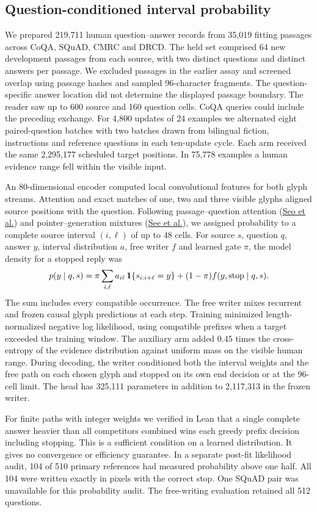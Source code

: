 \subsection*{Question-conditioned interval probability}
We prepared 219,711 human question--answer records from 35,019 fitting passages across CoQA, SQuAD, CMRC and DRCD. The held set comprised 64 new development passages from each source, with two distinct questions and distinct answers per passage. We excluded passages in the earlier assay and screened overlap using passage hashes and sampled 96-character fragments. The question-specific answer location did not determine the displayed passage boundary. The reader saw up to 600 source and 160 question cells. CoQA queries could include the preceding exchange. For 4,800 updates of 24 examples we alternated eight paired-question batches with two batches drawn from bilingual fiction, instructions and reference questions in each ten-update cycle. Each arm received the same 2,295,177 scheduled target positions. In 75,778 examples a human evidence range fell within the visible input.

An 80-dimensional encoder computed local convolutional features for both glyph streams. Attention and exact matches of one, two and three visible glyphs aligned source positions with the question. Following passage--question attention (\href{https://arxiv.org/abs/1611.01603}{Seo et al.}) and pointer--generation mixtures (\href{https://aclanthology.org/P17-1099/}{See et al.}), we assigned probability to a complete source interval $(i,\ell)$ of up to 48 cells. For source $s$, question $q$, answer $y$, interval distribution $a$, free writer $f$ and learned gate $\pi$, the model density for a stopped reply was
\[
 p(y\mid q,s)=\pi\sum_{i,\ell}a_{i\ell}\,
 {\bf1}\{s_{i:i+\ell}=y\}+(1-\pi)f(y,\mathrm{stop}\mid q,s).
\]
The sum includes every compatible occurrence. The free writer mixes recurrent and frozen causal glyph predictions at each step. Training minimized length-normalized negative log likelihood, using compatible prefixes when a target exceeded the training window. The auxiliary arm added $0.45$ times the cross-entropy of the evidence distribution against uniform mass on the visible human range. During decoding, the writer conditioned both the interval weights and the free path on each chosen glyph and stopped on its own end decision or at the 96-cell limit. The head has 325,111 parameters in addition to 2,117,313 in the frozen writer.

For finite paths with integer weights we verified in Lean that a single complete answer heavier than all competitors combined wins each greedy prefix decision including stopping. This is a sufficient condition on a learned distribution. It gives no convergence or efficiency guarantee. In a separate post-fit likelihood audit, 104 of 510 primary references had measured probability above one half. All 104 were written exactly in pixels with the correct stop. One SQuAD pair was unavailable for this probability audit. The free-writing evaluation retained all 512 questions.
